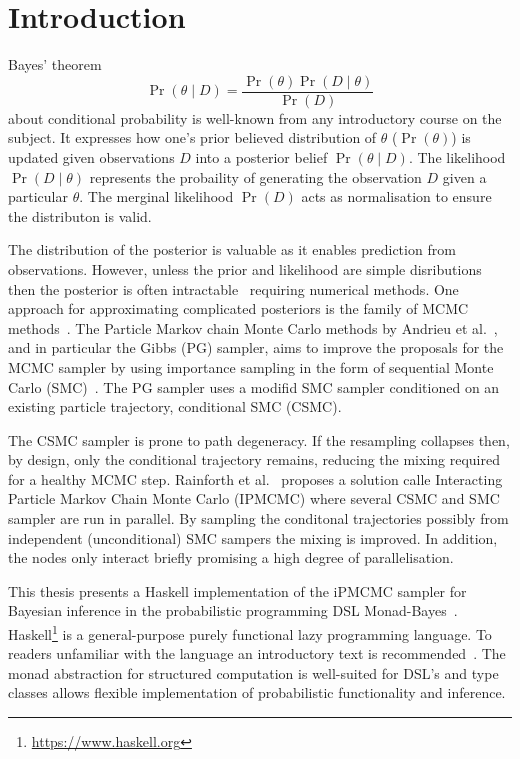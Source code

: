 \section{Introduction}

Bayes' theorem
\begin{equation}
    \Pr(\theta\mid D) = \frac {\Pr(\theta) \Pr(D \mid \theta)}{\Pr(D)}
\end{equation}
about conditional probability is well-known from any introductory course on the subject. It expresses how one's prior believed distribution of $\theta$ ($\Pr(\theta)$) is updated given observations $D$ into a posterior belief $\Pr(\theta\mid D)$. The likelihood $\Pr(D \mid \theta)$ represents the probaility of generating the observation $D$ given a particular $\theta$. The merginal likelihood $\Pr(D)$ acts as normalisation to ensure the distributon is valid.

The distribution of the posterior is valuable as it enables prediction from observations. However, unless the prior and likelihood are simple disributions then the posterior is often intractable~\cite{barber} requiring numerical methods. One approach for approximating complicated posteriors is the family of MCMC  methods~\cite{robert}. The Particle Markov chain Monte Carlo methods by Andrieu et al.~\cite{pmcmc}, and in particular the Gibbs (PG) sampler, aims to improve the proposals for the MCMC sampler by using importance sampling in the form of sequential Monte Carlo (SMC)~\cite{smc}. The PG sampler uses a modifid SMC sampler conditioned on an existing particle trajectory, conditional SMC (CSMC).

The CSMC sampler is prone to path degeneracy. If the resampling collapses then, by design, only the conditional trajectory remains, reducing the mixing required for a healthy MCMC step. Rainforth et al.~\cite{ipmcmc} proposes a solution calle Interacting Particle Markov Chain Monte Carlo (IPMCMC) where several CSMC and SMC sampler are run in parallel. By sampling the conditonal trajectories possibly from independent (unconditional) SMC sampers the mixing is improved. In addition, the nodes only interact briefly promising a high degree of parallelisation.

This thesis presents a Haskell implementation of the iPMCMC sampler for Bayesian inference in the probabilistic programming DSL Monad-Bayes~\cite{mbayes}. Haskell\footnote{\url{https://www.haskell.org}} is a general-purpose purely functional lazy programming language. To readers unfamiliar with the language an introductory text is recommended~\cite{haskell}. The monad abstraction for structured computation is well-suited for DSL's and type classes allows flexible implementation of probabilistic functionality and inference.

